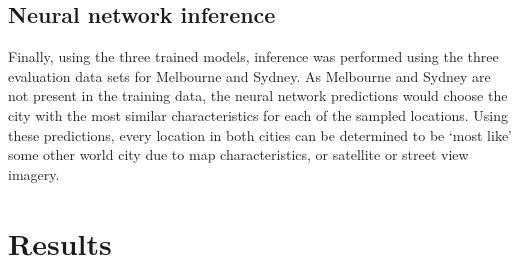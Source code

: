 \documentclass[sageh,times]{sagej}
\begin{document}
%
%
%
%
%



\subsection{Neural network inference}\label{sec:methods5}    
Finally, using the three trained models, inference was performed using the three evaluation data sets for Melbourne and Sydney. As Melbourne and Sydney are not present in the training data, the neural network predictions would choose the city with the most similar characteristics for each of the sampled locations. Using these predictions, every location in both cities can be determined to be `most like' some other world city due to map characteristics, or satellite or street view imagery.





\section{Results}\label{sec:results}
\end{document}
